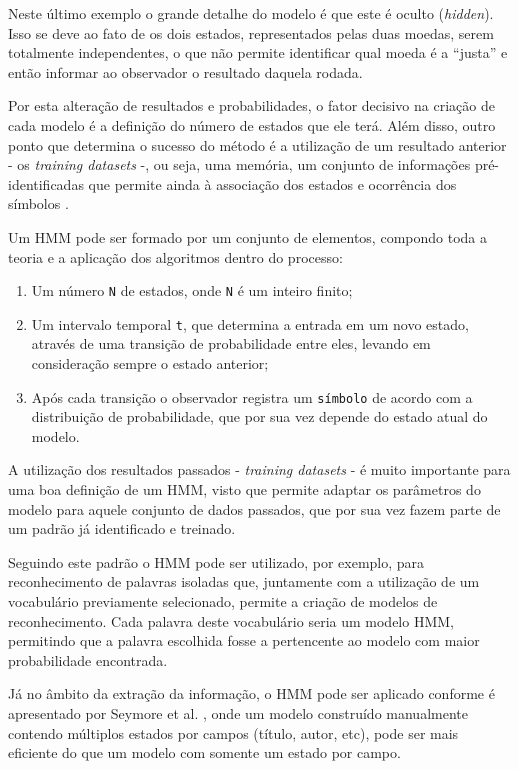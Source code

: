 Neste último exemplo o grande detalhe do modelo é que este é oculto (\textit{hidden}). Isso se deve ao fato de os dois estados, representados pelas duas moedas, serem totalmente independentes, o que não permite identificar qual moeda é a ``justa'' e então informar ao observador o resultado daquela rodada.

Por esta alteração de resultados e probabilidades, o fator decisivo na criação de cada modelo é a definição do número de estados que ele terá. Além disso, outro ponto que determina o sucesso do método é a utilização de um resultado anterior - os \textit{training datasets} -, ou seja, uma memória, um conjunto de informações pré-identificadas que permite ainda à associação dos estados e ocorrência dos símbolos \cite{Rabiner-HMM}.

Um HMM pode ser formado por um conjunto de elementos, compondo toda a teoria e a aplicação dos algoritmos dentro do processo:

\begin{enumerate}
    \item Um número \texttt{N} de estados, onde \texttt{N} é um inteiro finito;
    \item Um intervalo temporal \texttt{t}, que determina a entrada em um novo estado, através de uma transição de probabilidade entre eles, levando em consideração sempre o estado anterior;
    \item Após cada transição o observador registra um \texttt{símbolo} de acordo com a distribuição de probabilidade, que por sua vez depende do estado atual do modelo.
\end{enumerate}

A utilização dos resultados passados - \textit{training datasets} - é muito importante para uma boa definição de um HMM, visto que permite adaptar os parâmetros do modelo para aquele conjunto de dados passados, que por sua vez fazem parte de um padrão já identificado e treinado.

Seguindo este padrão o HMM pode ser utilizado, por exemplo, para reconhecimento de palavras isoladas que, juntamente com a utilização de um vocabulário previamente selecionado, permite a criação de modelos de reconhecimento. Cada palavra deste vocabulário seria um modelo HMM, permitindo que a palavra escolhida fosse a pertencente ao modelo com maior probabilidade encontrada.

Já no âmbito da extração da informação, o HMM pode ser aplicado conforme é apresentado por Seymore et al. \cite{Seymore-HMM-IE}, onde um modelo construído manualmente contendo múltiplos estados por campos (título, autor, etc), pode ser mais eficiente do que um modelo com somente um estado por campo. 

